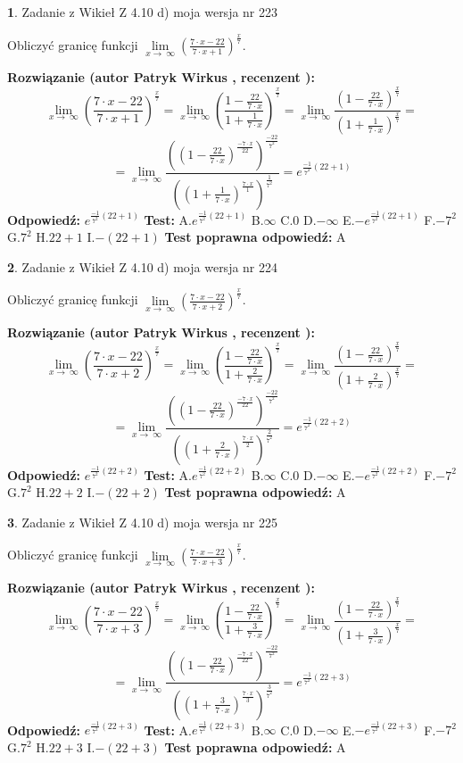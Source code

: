 \documentclass[12pt, a4paper]{article}
\theoremstyle{definition} %
\newtheorem{zad}{}
\newcommand{\zadStart}[1]{\begin{zad}#1\newline}
\newcommand{\zadStop}{\end{zad}}
\newcommand{\rozwStart}[2]{\noindent \textbf{Rozwiązanie (autor #1 , recenzent #2): }\newline}
\newcommand{\rozwStop}{\newline}
\newcommand{\odpStart}{\noindent \textbf{Odpowiedź:}\newline}
\newcommand{\odpStop}{\newline}
\newcommand{\testStart}{\noindent \textbf{Test:}\newline}
\newcommand{\testStop}{\newline}
\newcommand{\kluczStart}{\noindent \textbf{Test poprawna odpowiedź:}\newline}
\newcommand{\kluczStop}{\newline}
\begin{document}
\zadStart{Zadanie z Wikieł Z 4.10 d) moja wersja nr 223}


Obliczyć granicę funkcji  $\lim\limits_{x\to\ \infty}(\frac{7\cdot x-22}{7\cdot x+1})^{\frac{x}{7}}$.
\zadStop
\rozwStart{Patryk Wirkus}{}
$$\lim\limits_{x\to\ \infty}(\frac{7\cdot x-22}{7\cdot x+1})^{\frac{x}{7}} = \lim\limits_{x\to\ \infty}(\frac{1-\frac{22}{7\cdot x}}{1+\frac{1}{7\cdot x}})^{\frac{x}{7}}=\lim\limits_{x\to\ \infty}\frac{(1-\frac{22}{7\cdot x})^{\frac{x}{7}}}{(1+\frac{1}{7\cdot x})^{\frac{x}{7}}}=$$
$$=\lim\limits_{x\to\ \infty}\frac{((1-\frac{22}{7\cdot x})^{\frac{-7\cdot x}{22}})^{\frac{-22}{7^{2}}}}{((1+\frac{1}{7\cdot x})^{\frac{7\cdot x}{1}})^{\frac{1}{7^{2}}}}=e^{\frac{-1}{7^{2}}(22+1)}$$
\rozwStop
\odpStart
$e^{\frac{-1}{7^{2}}(22+1)}$
\odpStop
\testStart
A.$e^{\frac{-1}{7^{2}}(22+1)}$ B.$\infty$ C.$0$ D.$-\infty$ E.$-e^{\frac{-1}{7^{2}}(22+1)}$
F.$-7^{2}$ G.$7^{2}$
H.$22+1$
I.$-(22+1)$
\testStop
\kluczStart
A
\kluczStop



\zadStart{Zadanie z Wikieł Z 4.10 d) moja wersja nr 224}


Obliczyć granicę funkcji  $\lim\limits_{x\to\ \infty}(\frac{7\cdot x-22}{7\cdot x+2})^{\frac{x}{7}}$.
\zadStop
\rozwStart{Patryk Wirkus}{}
$$\lim\limits_{x\to\ \infty}(\frac{7\cdot x-22}{7\cdot x+2})^{\frac{x}{7}} = \lim\limits_{x\to\ \infty}(\frac{1-\frac{22}{7\cdot x}}{1+\frac{2}{7\cdot x}})^{\frac{x}{7}}=\lim\limits_{x\to\ \infty}\frac{(1-\frac{22}{7\cdot x})^{\frac{x}{7}}}{(1+\frac{2}{7\cdot x})^{\frac{x}{7}}}=$$
$$=\lim\limits_{x\to\ \infty}\frac{((1-\frac{22}{7\cdot x})^{\frac{-7\cdot x}{22}})^{\frac{-22}{7^{2}}}}{((1+\frac{2}{7\cdot x})^{\frac{7\cdot x}{2}})^{\frac{2}{7^{2}}}}=e^{\frac{-1}{7^{2}}(22+2)}$$
\rozwStop
\odpStart
$e^{\frac{-1}{7^{2}}(22+2)}$
\odpStop
\testStart
A.$e^{\frac{-1}{7^{2}}(22+2)}$ B.$\infty$ C.$0$ D.$-\infty$ E.$-e^{\frac{-1}{7^{2}}(22+2)}$
F.$-7^{2}$ G.$7^{2}$
H.$22+2$
I.$-(22+2)$
\testStop
\kluczStart
A
\kluczStop



\zadStart{Zadanie z Wikieł Z 4.10 d) moja wersja nr 225}


Obliczyć granicę funkcji  $\lim\limits_{x\to\ \infty}(\frac{7\cdot x-22}{7\cdot x+3})^{\frac{x}{7}}$.
\zadStop
\rozwStart{Patryk Wirkus}{}
$$\lim\limits_{x\to\ \infty}(\frac{7\cdot x-22}{7\cdot x+3})^{\frac{x}{7}} = \lim\limits_{x\to\ \infty}(\frac{1-\frac{22}{7\cdot x}}{1+\frac{3}{7\cdot x}})^{\frac{x}{7}}=\lim\limits_{x\to\ \infty}\frac{(1-\frac{22}{7\cdot x})^{\frac{x}{7}}}{(1+\frac{3}{7\cdot x})^{\frac{x}{7}}}=$$
$$=\lim\limits_{x\to\ \infty}\frac{((1-\frac{22}{7\cdot x})^{\frac{-7\cdot x}{22}})^{\frac{-22}{7^{2}}}}{((1+\frac{3}{7\cdot x})^{\frac{7\cdot x}{3}})^{\frac{3}{7^{2}}}}=e^{\frac{-1}{7^{2}}(22+3)}$$
\rozwStop
\odpStart
$e^{\frac{-1}{7^{2}}(22+3)}$
\odpStop
\testStart
A.$e^{\frac{-1}{7^{2}}(22+3)}$ B.$\infty$ C.$0$ D.$-\infty$ E.$-e^{\frac{-1}{7^{2}}(22+3)}$
F.$-7^{2}$ G.$7^{2}$
H.$22+3$
I.$-(22+3)$
\testStop
\kluczStart
A
\kluczStop
\end{document}

